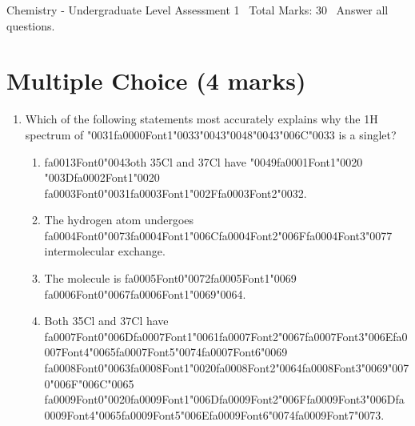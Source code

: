 \documentclass[12pt]{article}
\begin{document}
\begin{center}
Chemistry - Undergraduate Level Assessment 1 \
Total Marks: 30 \
Answer all questions.
\end{center}

\section*{Multiple Choice (4 marks)}
\begin{enumerate}[label=\arabic*.]
\item Which of the following statements most accurately explains why the 1H spectrum of {\char"0031}{\csname fa0000Font1\endcsname\char"0033}{\char"0043}{\char"0048}{\char"0043}{\char"006C}{\char"0033} is a singlet?
\begin{enumerate}[label=(\alph*)]
    \item {\csname fa0013Font0\endcsname\char"0043}oth 35Cl and 37Cl have {\char"0049}{\csname fa0001Font1\endcsname\char"0020} {\char"003D}{\csname fa0002Font1\endcsname\char"0020} {\csname fa0003Font0\endcsname\char"0031}{\csname fa0003Font1\endcsname\char"002F}{\csname fa0003Font2\endcsname\char"0032}.
    \item The hydrogen atom undergoes {\csname fa0004Font0\endcsname\char"0073}{\csname fa0004Font1\endcsname\char"006C}{\csname fa0004Font2\endcsname\char"006F}{\csname fa0004Font3\endcsname\char"0077} intermolecular exchange.
    \item The molecule is {\csname fa0005Font0\endcsname\char"0072}{\csname fa0005Font1\endcsname\char"0069} {\csname fa0006Font0\endcsname\char"0067}{\csname fa0006Font1\endcsname\char"0069}{\char"0064}.
    \item Both 35Cl and 37Cl have {\csname fa0007Font0\endcsname\char"006D}{\csname fa0007Font1\endcsname\char"0061}{\csname fa0007Font2\endcsname\char"0067}{\csname fa0007Font3\endcsname\char"006E}{\csname fa0007Font4\endcsname\char"0065}{\csname fa0007Font5\endcsname\char"0074}{\csname fa0007Font6\endcsname\char"0069} {\csname fa0008Font0\endcsname\char"0063}{\csname fa0008Font1\endcsname\char"0020}{\csname fa0008Font2\endcsname\char"0064}{\csname fa0008Font3\endcsname\char"0069}{\char"0070}{\char"006F}{\char"006C}{\char"0065} {\csname fa0009Font0\endcsname\char"0020}{\csname fa0009Font1\endcsname\char"006D}{\csname fa0009Font2\endcsname\char"006F}{\csname fa0009Font3\endcsname\char"006D}{\csname fa0009Font4\endcsname\char"0065}{\csname fa0009Font5\endcsname\char"006E}{\csname fa0009Font6\endcsname\char"0074}{\csname fa0009Font7\endcsname\char"0073}.

\end{enumerate}
\end{enumerate}
\end{document}
